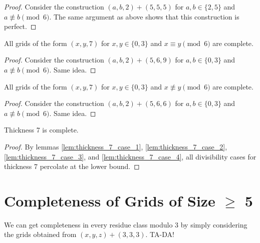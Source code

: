\begin{proof}
Consider the construction $(a,b,2) + (5,5,5)$ for $a,b \in \{2,5\}$ and $a \not\equiv b \pmod 6$. The same argument as above shows that this construction is perfect.
\end{proof}

\begin{lem}
\label{lem:thickness_7_case_3}
All grids of the form $(x,y,7)$ for $x,y \in \{0,3\}$ and $x \equiv y \pmod 6$ are complete.
\end{lem}

\begin{proof}
Consider the construction $(a,b,2) + (5,6,9)$ for $a,b \in \{0,3\}$ and $a \not\equiv b \pmod 6$. Same idea.
\end{proof}

\begin{lem}
\label{lem:thickness_7_case_4}
All grids of the form $(x,y,7)$ for $x,y \in \{0,3\}$ and $x \not\equiv y \pmod 6$ are complete.
\end{lem}

\begin{proof}
Consider the construction $(a,b,2) + (5,6,6)$ for $a,b \in \{0,3\}$ and $a \not\equiv b \pmod 6$. Same idea.
\end{proof}

\begin{lem}
Thickness 7 is complete.
\end{lem}

\begin{proof}
By lemmas \ref{lem:thickness_7_case_1}, \ref{lem:thickness_7_case_2}, \ref{lem:thickness_7_case_3}, and \ref{lem:thickness_7_case_4}, all divisibility cases for thickness 7 percolate at the lower bound.
\end{proof}

\section{Completeness of Grids of Size $\geq$ 5}

We can get completeness in every residue class modulo 3 by simply considering the grids obtained from $(x,y,z)+(3,3,3)$. TA-DA!




